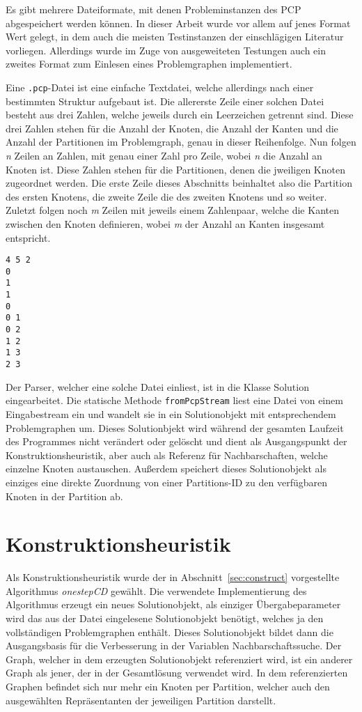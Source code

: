 Es gibt mehrere Dateiformate, mit denen Probleminstanzen des PCP abgespeichert werden können. In dieser Arbeit wurde vor allem auf jenes
Format Wert gelegt, in dem auch die meisten Testinstanzen der einschlägigen Literatur vorliegen. Allerdings wurde im Zuge von aus\-ge\-wei\-te\-ten 
Testungen auch ein zweites Format zum Einlesen eines Problemgraphen implementiert. 

Eine \texttt{.pcp}-Datei ist eine einfache Textdatei, welche allerdings nach einer bestimmten Struktur aufgebaut ist. Die allererste Zeile
einer solchen Datei besteht aus drei Zahlen, welche jeweils durch ein Leerzeichen getrennt sind. Diese drei Zahlen stehen für die Anzahl der Knoten, 
die Anzahl der Kanten und die Anzahl der Partitionen im Problemgraph, genau in dieser Reihenfolge. Nun folgen \textit{n} Zeilen an Zahlen, mit 
genau einer Zahl pro Zeile, wobei \textit{n} die Anzahl an Knoten ist. Diese Zahlen stehen für die Partitionen, denen die jweiligen Knoten zugeordnet werden.
Die erste Zeile dieses Abschnitts beinhaltet also die Partition des ersten Knotens, die zweite Zeile die des zweiten Knotens und so weiter. Zuletzt folgen noch
\textit{m} Zeilen mit jeweils einem Zahlenpaar, welche die Kanten zwischen den Knoten definieren, wobei \textit{m} der Anzahl an Kanten insgesamt
entspricht.

\singlespacing
\begin{lstlisting}[caption={Eine einfache \textit{.pcp}-Beispieldatei},label={lst:pcp}]
4 5 2
0
1
1
0
0 1
0 2
1 2
1 3
2 3
\end{lstlisting}

Der Parser, welcher eine solche Datei einliest, ist in die Klasse Solution eingearbeitet. Die statische Methode \texttt{fromPcpStream} liest eine
Datei von einem Eingabestream ein und wandelt sie in ein Solutionobjekt mit entsprechendem Problemgraphen um. Dieses Solutionbjekt wird während
der gesamten Laufzeit des Programmes nicht verändert oder gelöscht und dient als Ausgangspunkt der Konstruktionsheuristik, aber auch als
Referenz für Nachbarschaften, welche einzelne Knoten austauschen. Außerdem speichert dieses Solutionobjekt als einziges eine direkte Zuordnung von einer Partitions-ID
zu den verfügbaren Knoten in der Partition ab. 

\section{Konstruktionsheuristik}
Als Konstruktionsheuristik wurde der in Abschnitt~\ref{sec:construct} vorgestellte Algorithmus \emph{onestepCD} gewählt. Die verwendete Implementierung des Algorithmus
erzeugt ein neues Solutionobjekt, als einziger Übergabeparameter wird das aus der Datei eingelesene Solutionobjekt benötigt, welches ja den vollständigen Problemgraphen
enthält. Dieses Solutionobjekt bildet dann die Ausgangsbasis für die Verbesserung in der Variablen Nachbarschaftssuche. Der Graph, welcher in dem erzeugten Solutionobjekt
referenziert wird, ist ein anderer Graph als jener, der in der Gesamtlösung verwendet wird. In dem referenzierten Graphen befindet sich nur mehr ein Knoten per Partition, welcher auch den ausgewählten Repräsentanten der jeweiligen Partition darstellt.

